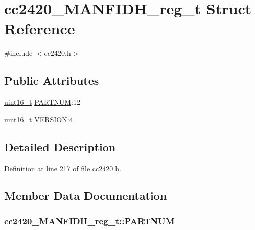 \hypertarget{structcc2420___m_a_n_f_i_d_h__reg__t}{}\section{cc2420\+\_\+\+M\+A\+N\+F\+I\+D\+H\+\_\+reg\+\_\+t Struct Reference}
\label{structcc2420___m_a_n_f_i_d_h__reg__t}


{\ttfamily \#include $<$cc2420.\+h$>$}

\subsection*{Public Attributes}
\begin{DoxyCompactItemize}
\item 
\hyperlink{_p_e___types_8h_a1f1825b69244eb3ad2c7165ddc99c956}{uint16\+\_\+t} \hyperlink{structcc2420___m_a_n_f_i_d_h__reg__t_ad6a4428140de60b64c595b4e94b25e79}{P\+A\+R\+T\+N\+UM}\+:12
\item 
\hyperlink{_p_e___types_8h_a1f1825b69244eb3ad2c7165ddc99c956}{uint16\+\_\+t} \hyperlink{structcc2420___m_a_n_f_i_d_h__reg__t_a86eb910c04dd60413d0c00799f565ffd}{V\+E\+R\+S\+I\+ON}\+:4
\end{DoxyCompactItemize}


\subsection{Detailed Description}


Definition at line 217 of file cc2420.\+h.



\subsection{Member Data Documentation}
\subsubsection[{\texorpdfstring{P\+A\+R\+T\+N\+UM}{PARTNUM}}]{ cc2420\+\_\+\+M\+A\+N\+F\+I\+D\+H\+\_\+reg\+\_\+t\+::\+P\+A\+R\+T\+N\+UM}\hypertarget{structcc2420___m_a_n_f_i_d_h__reg__t_ad6a4428140de60b64c595b4e94b25e79}{}\label{structcc2420___m_a_n_f_i_d_h__reg__t_ad6a4428140de60b64c595b4e94b25e79}


